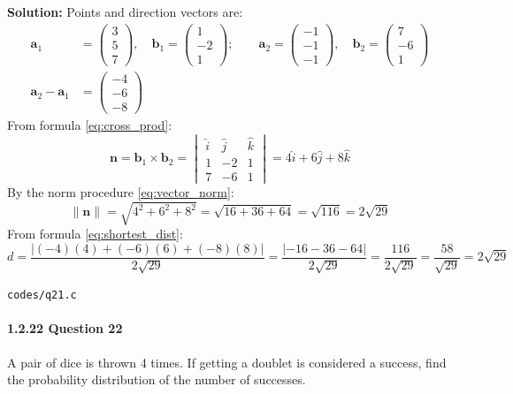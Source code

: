 \documentclass{article}
\begin{document}
\textbf{Solution:} Points and direction vectors are:
\begin{align}
\mathbf{a}_1 &= \begin{pmatrix} 3 \\ 5 \\ 7 \end{pmatrix}, \quad \mathbf{b}_1 = \begin{pmatrix} 1 \\ -2 \\ 1 \end{pmatrix}; \qquad \mathbf{a}_2 = \begin{pmatrix} -1 \\ -1 \\ -1 \end{pmatrix}, \quad \mathbf{b}_2 = \begin{pmatrix} 7 \\ -6 \\ 1 \end{pmatrix} \\
\mathbf{a}_2 - \mathbf{a}_1 &= \begin{pmatrix} -4 \\ -6 \\ -8 \end{pmatrix}
\end{align}
From formula \eqref{eq:cross_prod}:
\begin{equation}
\mathbf{n} = \mathbf{b}_1 \times \mathbf{b}_2 = \begin{vmatrix} \hat{i} & \hat{j} & \hat{k} \\ 1 & -2 & 1 \\ 7 & -6 & 1 \end{vmatrix} = 4\hat{i} + 6\hat{j} + 8\hat{k}
\end{equation}
By the norm procedure \eqref{eq:vector_norm}:
\begin{equation}
\|\mathbf{n}\| = \sqrt{4^2 + 6^2 + 8^2} = \sqrt{16 + 36 + 64} = \sqrt{116} = 2\sqrt{29}
\end{equation}
From formula \eqref{eq:shortest_dist}:
\begin{equation}
d = \frac{|(-4)(4) + (-6)(6) + (-8)(8)|}{2\sqrt{29}} = \frac{|-16 - 36 - 64|}{2\sqrt{29}} = \frac{116}{2\sqrt{29}} = \frac{58}{\sqrt{29}} = 2\sqrt{29}
\end{equation}
\begin{tcolorbox}[colback=gray!10,colframe=black,width=\linewidth]
\texttt{codes/q21.c}
\end{tcolorbox}

\paragraph{1.2.22 Question 22}
A pair of dice is thrown 4 times. If getting a doublet is considered a success, find the probability distribution of the number of successes.
\end{document}
